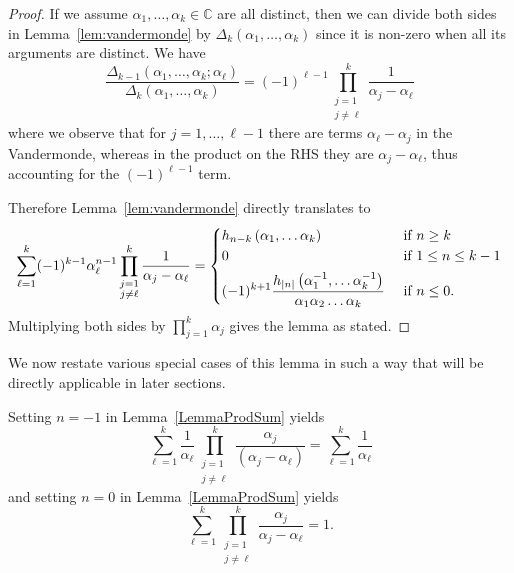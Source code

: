 \documentclass[12pt,a4paper,reqno]{amsart}
\theoremstyle{remark}
\numberwithin{equation}{section}
\begin{document}
\begin{proof}
If we assume $\alpha_1,\dots,\alpha_k \in \mathbb{C}$ are all distinct, then we can divide both sides in Lemma~\ref{lem:vandermonde} by $\Delta_k(\alpha_1,\dots,\alpha_k)$ since it is non-zero when all its arguments are distinct. We have
\begin{equation*}
\frac{\Delta_{k-1}(\alpha_1,\dots,\alpha_k ; \alpha_\ell)}{\Delta_k(\alpha_1,\dots,\alpha_k)} = (-1)^{\ell-1} \prod_{\substack{j=1\\j \neq \ell}}^k \frac{1}{\alpha_j-\alpha_\ell}
\end{equation*}
where we observe that for $j=1,\dots,\ell-1$ there are terms  $\alpha_\ell-\alpha_j$ in the Vandermonde, whereas in the product on the RHS they are  $\alpha_j-\alpha_\ell$, thus accounting for the $(-1)^{\ell-1}$ term.

Therefore Lemma~\ref{lem:vandermonde} directly translates to
\begin{equation}\label{eq:combsum}
\sum_{\ell=1}^k (-1)^{k-1}   \alpha_\ell^{n-1}   \prod_{\substack{j=1\\j \neq \ell}}^k \frac{1}{\alpha_j-\alpha_\ell}
=
\begin{cases}
\displaystyle  h_{n-k}\left(\alpha_1, \dots \alpha_k\right) & \text{ if } n \geq k \\
0 & \text{ if } 1\leq n \leq k-1 \\
\noalign{\vskip1ex}
\displaystyle (-1)^{k+1} \frac{ h_{|n|}\left(\alpha_1^{-1}, \dots \alpha_k^{-1}\right)}{\alpha_1 \alpha_2 \dots \alpha_k} & \text{ if } n \leq 0.
\end{cases}
\end{equation}
Multiplying both sides by $\prod_{j=1}^k \alpha_j$ gives the lemma as stated.
\end{proof}

We now restate various special cases of this lemma in such a way that will be directly applicable in later sections.

Setting $n=-1$ in Lemma~\ref{LemmaProdSum} yields
\begin{equation}\label{eq:LemmaZero}
\sum_{\ell=1}^{k} \frac{1}{\alpha_\ell} \prod_{ \substack{j=1 \\ j \neq \ell}}^{k} \frac{\alpha_j}{(\alpha_j - \alpha_\ell)} = \sum_{\ell=1}^{k} \frac{1}{\alpha_\ell}
\end{equation}
and setting $n=0$ in Lemma~\ref{LemmaProdSum} yields
\begin{equation}\label{eq:lem:n0Term}
\sum_{\ell=1}^k \prod_{\substack{j=1\\j\neq \ell}}^k \frac{\alpha_j}{\alpha_j-\alpha_\ell} = 1.
\end{equation}
\end{document}
